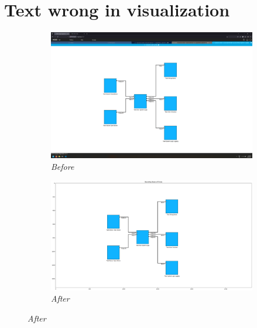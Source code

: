 \documentclass{article}
\begin{document}
\section{Text wrong in visualization}
\begin{figure}[H]
    \centering
    \begin{subfigure}[t]{0.9\textwidth}
        \centering
        \includegraphics[width=\textwidth]{testcases/text_wrong_in_visualization/160949-255974_input_image.png}
        \caption*{\textit{Before}}
    \end{subfigure}
    \newline
    \begin{subfigure}[t]{0.9\textwidth}
        \centering
        \includegraphics[width=\textwidth]{testcases/text_wrong_in_visualization/161009-586327_element_bbox_errors_labeled_colored.png}
        \caption*{\textit{After}}
    \end{subfigure}
    \label{fig:text_wrong_in_viz}
\end{figure}
\newpage
\end{document}
